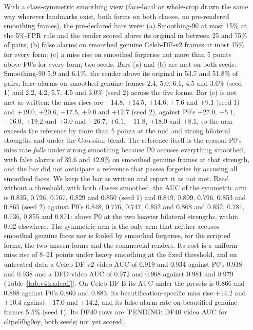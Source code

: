 With a class-symmetric smoothing view (face-local or whole-crop drawn the same way wherever landmarks exist, both forms
on both classes, no pre-rendered smoothing frames), the pre-declared bars were: (a) Smoothing-90 at most 15\% at the
5\%-FPR rule and the render scored above its original in between 25 and 75\% of pairs; (b) false alarms on smoothed
genuine Celeb-DF-v2 frames at most 15\% for every form; (c) a miss rise on smoothed forgeries not more than 5 points
above P0's for every form; two seeds. Bars (a) and (b) are met on both seeds: Smoothing-90 5.9 and 6.1\%, the render
above its original in 53.7 and 51.8\% of pairs, false alarms on smoothed genuine frames 2.4, 5.0, 6.1, 4.5 and 3.6\% (seed
1) and 2.2, 4.2, 5.7, 4.5 and 3.0\% (seed 2) across the five forms. Bar (c) is not met as written: the miss rises are
$+14.8$, $+14.5$, $+14.6$, $+7.6$ and $+9.1$ (seed 1) and $+19.0$, $+20.6$, $+17.5$, $+9.0$ and $+12.7$ (seed 2), against
P0's $+27.0$, $+5.1$, $-16.0$, $+19.2$ and $+3.0$ and $+26.7$, $+6.1$, $-11.8$, $+18.0$ and $+8.1$, so the arm exceeds the
reference by more than 5 points at the mid and strong bilateral strengths and under the Gaussian blend. The reference
itself is the reason: P0's miss rate \emph{falls} under strong smoothing because P0 accuses everything smoothed, with
false alarms of 39.6 and 42.9\% on smoothed genuine frames at that strength, and the bar did not anticipate a reference
that passes forgeries by accusing all smoothed faces. We keep the bar as written and report it as not met. Read without
a threshold, with both classes smoothed, the AUC of the symmetric arm is 0.835, 0.796, 0.767, 0.829 and 0.850 (seed 1)
and 0.849, 0.809, 0.796, 0.853 and 0.865 (seed 2) against P0's 0.848, 0.776, 0.747, 0.852 and 0.868 and 0.852, 0.781,
0.736, 0.855 and 0.871: above P0 at the two heavier bilateral strengths, within 0.02 elsewhere. The symmetric arm is the
only arm that neither accuses smoothed genuine faces nor is fooled by smoothed forgeries, for the scripted forms,
the two unseen forms and the commercial renders. Its cost is a uniform miss rise of 8--21 points under heavy smoothing
at the fixed threshold, and on untreated data a Celeb-DF-v2 video AUC of 0.919 and 0.934 against P0's 0.938 and 0.938
and a DFD video AUC of 0.972 and 0.968 against 0.981 and 0.979 (Table~\ref{tab:v4tradeoff}). On Celeb-DF-B its AUC under
the presets is 0.866 and 0.888 against P0's 0.860 and 0.883, its beautification-specific miss rise $+14.2$ and $+10.4$
against $+17.0$ and $+14.2$, and its false-alarm rate on beautified genuine frames 5.5\% (seed 1). Its DF40 rows are
[PENDING: DF40 video AUC for clipe5fbg0oy, both seeds; not yet scored].

